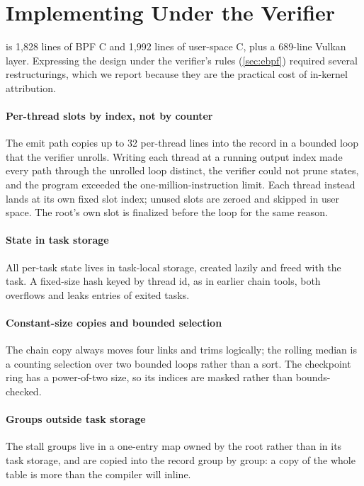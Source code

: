 \section{Implementing Under the Verifier}
\label{sec:verifier}

\sys is 1,828 lines of BPF C and 1,992 lines of user-space C, plus a
689-line Vulkan layer. Expressing the design under the verifier's rules
(\autoref{sec:ebpf}) required several restructurings, which we report
because they are the practical cost of in-kernel attribution.

\paragraph{Per-thread slots by index, not by counter} The emit path copies up to
32 per-thread lines into the record in a bounded loop that the verifier
unrolls. Writing each thread at a running output index made every path
through the unrolled loop distinct, the verifier could not prune states, and
the program exceeded the one-million-instruction limit. Each thread instead
lands at its own fixed slot index; unused slots are zeroed and skipped in
user space. The root's own slot is finalized before the loop for the same
reason.

\paragraph{State in task storage} All per-task state lives in task-local
storage, created lazily and freed with the task. A fixed-size hash keyed by
thread id, as in earlier chain tools, both overflows and leaks entries of
exited tasks.

\paragraph{Constant-size copies and bounded selection} The chain copy always
moves four links and trims logically; the rolling median is a counting
selection over two bounded loops rather than a sort. The checkpoint ring has
a power-of-two size, so its indices are masked rather than bounds-checked.

\paragraph{Groups outside task storage} The stall groups live in a one-entry map
owned by the root rather than in its task storage, and are copied into the
record group by group: a copy of the whole table is more than the compiler
will inline.


